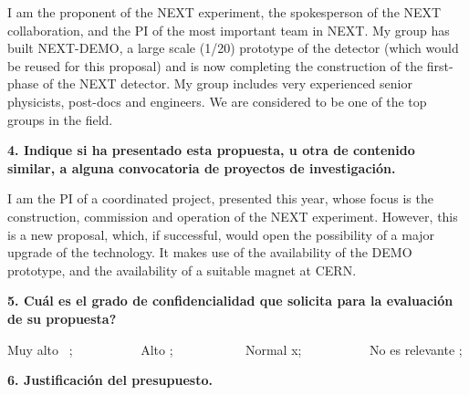 \noindent I am the proponent of the NEXT experiment, the spokesperson of the NEXT collaboration, and the PI of the most important team in NEXT. My group has built NEXT-DEMO, a large scale (1/20) prototype of the detector (which would be reused for this proposal) and is now completing the construction of the first-phase of the NEXT detector. My group includes very experienced senior physicists, post-docs and engineers. We are considered to be one of the top groups in the field. 

\vspace{6pt}

\noindent\textbf{4. Indique si ha presentado esta propuesta, u otra de contenido similar, a alguna convocatoria de proyectos de investigación.}

\noindent {\color{blue}{Máximo 500 caracteres}}

\vspace{6pt}

\noindent I am the PI of a coordinated project, presented this year, whose focus is the construction, commission and operation of the NEXT experiment. However, this is a new proposal, which, if successful, would open the possibility of a major upgrade of the technology. It makes use of the availability of the DEMO prototype, and the availability of a suitable magnet at CERN.

\vspace{6pt}
\noindent\textbf{5. Cuál es el grado de confidencialidad que solicita para la evaluación de su propuesta?}

\noindent Muy alto~  ;~~~~~~~~~~ Alto  ; ~~~~~~~~~~ Normal  x;  ~~~~~~~~~~No es relevante ;

\vspace{6pt}

\noindent\textbf{6. Justificación del presupuesto.}

\noindent {\color{blue}{Máximo 2000 caracteres}}

\vspace{6pt}


